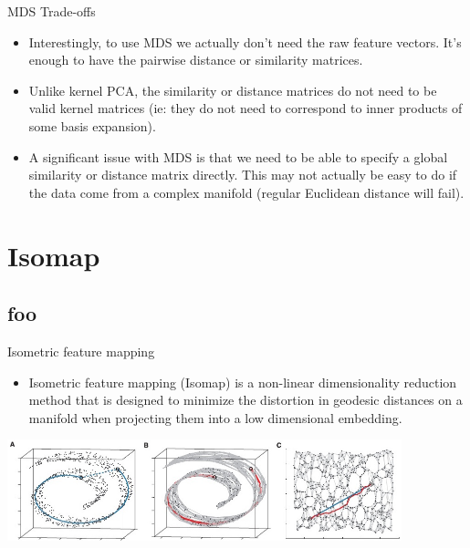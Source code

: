 \documentclass[serif,xcolor=pdftex,dvipsnames,table,hyperref={bookmarks=false,breaklinks}]{beamer}
\begin{document}
\begin{frame}[t]{MDS Trade-offs}

\begin{itemize}
\item Interestingly, to use MDS we actually don't need the raw feature vectors. 
It's enough to have the pairwise distance or similarity matrices.

\pause\item Unlike kernel PCA, the similarity or distance matrices do not need 
to be valid kernel matrices (ie: they do not need to correspond to inner 
products of some basis expansion).

\pause\item A significant issue with MDS is that we need to be able to specify 
a global similarity or distance matrix directly. This may not actually be easy 
to do if the data come from a complex manifold (regular Euclidean distance will 
fail).

\end{itemize}  
\end{frame}



\section{Isomap}
\subsection{foo}


\begin{frame}[t]{Isometric feature mapping}

\begin{itemize}
\item Isometric feature mapping (Isomap) is a non-linear dimensionality 
reduction method that is designed to minimize the distortion in geodesic 
distances on a manifold when projecting them into a low dimensional embedding.
\end{itemize} 

\pause
\center
\includegraphics[width=4.5in]{../Figures/isomap.jpg}


\end{frame}
\end{document}

